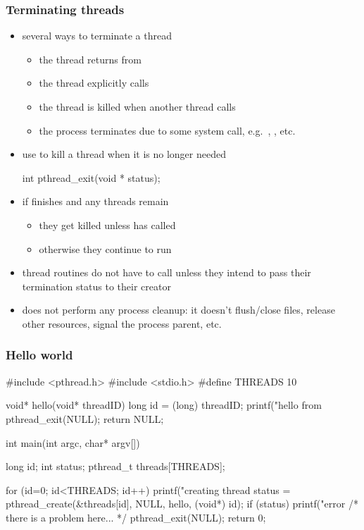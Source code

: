 \begin{frame}[fragile]
%
  \frametitle{Terminating threads}
%
  \begin{itemize}
%
    \item several ways to terminate a thread
      \begin{itemize}
      \item the thread returns from 
      \item the thread explicitly calls 
      \item the thread is killed when another thread calls 
      \item the process terminates due to some system call, e.g.~,
        , etc.
      \end{itemize}
%
  \item use  to kill a thread when it is no longer needed
%
    \begin{C}
int pthread_exit(void * status);
    \end{C}
%
  \item if  finishes and any threads remain
    \begin{itemize}
    \item they get killed unless  has called 
    \item otherwise they continue to run
    \end{itemize}
%
  \item thread routines do not have to call  unless they intend to pass
    their termination status to their creator
%
  \item {} does not perform any process cleanup: it doesn't flush/close
    files, release other resources, signal the process parent, etc.
  \end{itemize}
%
\end{frame}

\begin{frame}[fragile]
%
  \frametitle{Hello world}
%
  \begin{C}
#include <pthread.h>
#include <stdio.h>
#define THREADS 10

void* hello(void* threadID) {
    long id = (long) threadID;
    printf("hello from %
    pthread_exit(NULL);
    return NULL;
}

int main(int argc, char* argv[]) {
    long id;
    int status;
    pthread_t threads[THREADS];

    for (id=0; id<THREADS; id++) {
        printf("creating thread %
        status = pthread_create(&threads[id], NULL, hello, (void*) id);
        if (status) {
            printf("error %
        }
    }
    /* there is a problem here... */
    pthread_exit(NULL);
    return 0;
}
  \end{C}
%
\end{frame}

